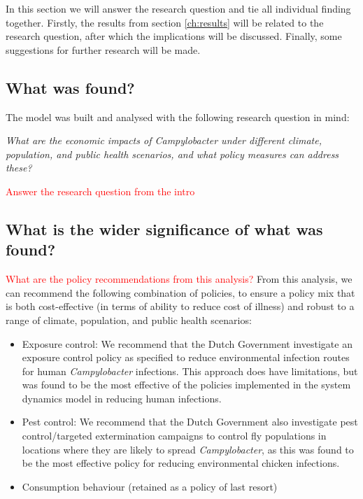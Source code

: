 In this section we will answer the research question and tie all individual finding together. Firstly, the results from section \ref{ch:results} will be related to the research question, after which the implications will be discussed. Finally, some suggestions for further research will be made. 

\subsection{What was found?}

The model was built and analysed with the following research question in mind: 

\begin{center}\textit{\textcolor{NiceBlue}{
What are the economic impacts of Campylobacter under different climate, population, and public health scenarios, and what policy measures can address these? }}
\end{center}


\textcolor{red}{Answer the research question from the intro}


\subsection{What is the wider significance of what was found?}
\textcolor{red}{What are the policy recommendations from this analysis?}
From this analysis, we can recommend the following combination of policies, to ensure a policy mix that is both cost-effective (in terms of ability to reduce cost of illness) and robust to a range of climate, population, and public health scenarios:
\begin{itemize}
    \item Exposure control: We recommend that the Dutch Government investigate an exposure control policy as specified to reduce environmental infection routes for human \textit{Campylobacter} infections. This approach does have limitations, but was found to be the most effective of the policies implemented in the system dynamics model in reducing human infections.
    \item Pest control: We recommend that the Dutch Government also investigate pest control/targeted extermination campaigns to control fly populations in locations where they are likely to spread \textit{Campylobacter}, as this was found to be the most effective policy for reducing environmental chicken infections.
    \item Consumption behaviour (retained as a policy of last resort)
\end{itemize}

